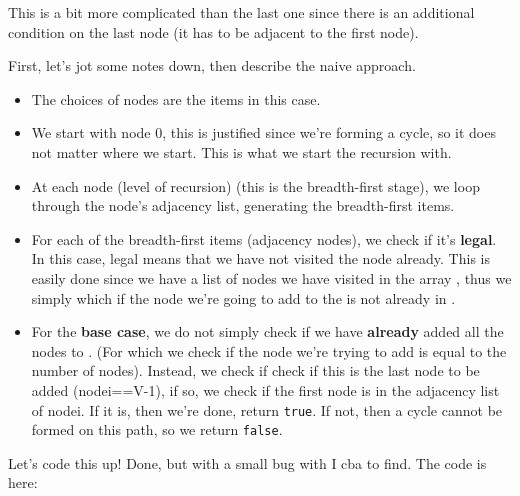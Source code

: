 \textbf{}

\RayNotesBegin

This is a bit more complicated than the last one since there is an
additional condition on the last node (it has to be adjacent to the first
node).

First, let's jot some notes down, then describe the naive approach.
\begin{itemize}[noitemsep,topsep=0pt]
\item The choices of nodes are the items in this case.
\item We start with node $0$, this is justified since we're forming a cycle,
  so it does not matter where we start. This is what we start the recursion
  with.
\item At each node (level of recursion) (this is the breadth-first stage),
  we loop through the node's adjacency list, generating the breadth-first
  items.
\item For each of the breadth-first items (adjacency nodes), we check if
  it's \textbf{legal}. In this case, legal means that we have not visited
  the node already. This is easily done since we have a list of nodes we
  have visited in the array , thus we simply which if the node
  we're going to add to the  is not already in .
\item For the \textbf{base case}, we do not simply check if we have
  \textbf{already} added all the nodes to . (For which we check if
  the node we're trying to add is equal to the number of nodes). Instead, we
  check if check if this is the last node to be added (nodei==V-1), if so,
  we check if the first node is in the adjacency list of nodei. If it is,
  then we're done, return \texttt{true}. If not, then a cycle cannot be
  formed on this path, so we return \texttt{false}.
\end{itemize}

Let's code this up!
Done, but with a small bug with I cba to find. The code is here:\\

\RayNotesEnd

\textbf{}






